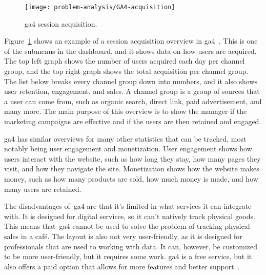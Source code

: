 \begin{figure}[H]
    \centering
    \texttt{[image: problem-analysis/GA4-acquisition]}
    \caption{\acrshort{ga4} session acquisition.
    }\label{fig:GA4-acquisition}
\end{figure}

Figure~\ref{fig:GA4-acquisition} shows an example of a session acquisition overview in \acrshort{ga4}~\cite{ga4-tips}.
This is one of the submenus in the dashboard, and it shows data on how users are acquired.
The top left graph shows the number of users acquired each day per channel group, and the top right graph shows the
total acquisition per channel group.
The list below breaks every channel group down into numbers, and it also shows user retention, engagement, and sales.
A channel group is a group of sources that a user can come from, such as organic search, direct link, paid
advertisement, and many more.
The main purpose of this overview is to show the manager if the marketing campaigns are effective and if the users are
then retained and engaged.

\acrshort{ga4} has similar overviews for many other statistics that can be tracked, most notably being user engagement
and monetization.
User engagement shows how users interact with the website, such as how long they stay, how many pages they visit, and
how they navigate the site.
Monetization shows how the website makes money, such as how many products are sold, how much money is made, and how
many users are retained.

The disadvantages of~\acrlong{ga4} are that it's limited in what services it can integrate with.
It is designed for digital services, so it can't natively track physical goods.
This means that~\acrshort{ga4} cannot be used to solve the problem of tracking physical sales in a café.
The layout is also not very user-friendly, as it is designed for professionals that are used to working with data.
It can, however, be customized to be more user-friendly, but it requires some work.
\acrshort{ga4} is a free service, but it also offers a paid option that allows for more features and better
support~\cite{ga4-360}.
